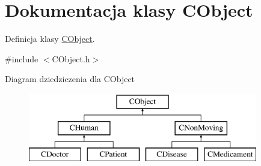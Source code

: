 \hypertarget{class_c_object}{}\section{Dokumentacja klasy C\+Object}
\label{class_c_object}


Definicja klasy \mbox{\hyperlink{class_c_object}{C\+Object}}.  




{\ttfamily \#include $<$C\+Object.\+h$>$}

Diagram dziedziczenia dla C\+Object\begin{figure}[H]
\begin{center}
\leavevmode
\includegraphics[height=3.000000cm]{class_c_object}
\end{center}
\end{figure}
